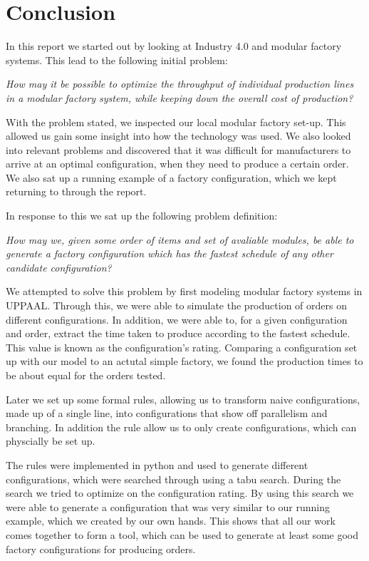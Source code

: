 \chapter{Conclusion}\label{ch:conclusion}
In this report we started out by looking at Industry 4.0 and modular factory systems. This lead to the following initial  problem:

\bigskip
\textit{How may it be possible to optimize the throughput of individual production lines in a modular factory system, while keeping down the overall cost of production?}
\bigskip

With the problem stated, we inspected our local modular factory set-up. This allowed us gain some insight into how the technology was used. We also looked into relevant problems and discovered that it was difficult for manufacturers to arrive at an optimal configuration, when they need to produce a certain order. We also sat up a running example of a factory configuration, which we kept returning to through the report.

In response to this we sat up the following problem definition:

\bigskip
\textit{How may we, given some order of items and set of avaliable modules, be able to generate a factory configuration which has the fastest schedule of any other candidate configuration?}
\bigskip

We attempted to solve this problem by first modeling modular factory systems in UPPAAL. Through this, we were able to simulate the production of orders on different configurations. In addition, we were able to, for a given configuration and order, extract the time taken to produce according to the fastest schedule. This value is known as the configuration's rating. Comparing a configuration set up with our model to an actutal simple factory, we found the production times to be about equal for the orders tested.

Later we set up some formal rules, allowing us to transform naive configurations, made up of a single line, into configurations that show off parallelism and branching. In addition the rule allow us to only create configurations, which can physcially be set up.

The rules were implemented in python and used to generate different configurations, which were searched through using a tabu search. During the search we tried to optimize on the configuration rating. By using this search we were able to generate a configuration that was very similar to our running example, which we created by our own hands. This shows that all our work comes together to form a tool, which can be used to generate at least some good factory configurations for producing orders.  